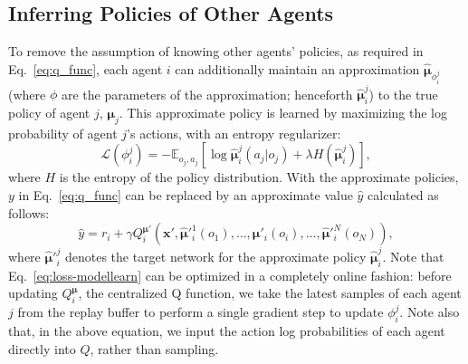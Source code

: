 \documentclass{article}
\newcommand{\comment}[1]{\textbf{\textcolor{red}{comment: #1}}}
\newcommand{\cpol}[0]{\pmb{\mu}}
\begin{document}
\subsection{Inferring Policies of Other Agents}
\label{sec:modellearning}
To remove the assumption of knowing other agents' policies, as required in Eq.~\ref{eq:q_func}, each agent $i$ can additionally maintain an approximation $\hat{\cpol}_{\phi_i^j}$ (where $\phi$ are the parameters of the approximation; henceforth $\hat{\cpol}_i^j$) to the true policy of agent $j$, $\cpol_j$. This approximate policy is learned by maximizing the log probability of agent $j$'s actions, with an entropy regularizer:
\begin{equation}\label{eq:loss-modellearn}
\mathcal{L}(\phi_i^j)=-\mathbb{E}_{o_j,a_j}\left[\log \hat{\cpol}_i^j(a_j|o_j) + \lambda H(\hat{\cpol}_i^j) \right],
\end{equation}
where $H$ is the entropy of the policy distribution. With the approximate policies, $y$ in Eq.~\ref{eq:q_func} can be replaced by an approximate value $\hat{y}$ calculated as follows: 
\begin{equation}\label{eq:approx_q_func}
\hat{y} = r_i + \gamma Q^{\cpol'}_i(\mathbf{x}', \hat{\cpol}'^1_i(o_1),\ldots,\cpol'_i(o_i),\ldots,\hat{\cpol}'^N_i(o_N)),
\end{equation}
where $\hat{\cpol}'^j_i$ denotes the target network for the approximate policy $\hat{\cpol}_i^j$.
Note that Eq.~\ref{eq:loss-modellearn} can be optimized in a completely online fashion: before updating  $Q^{\cpol}_i$, the centralized Q function, we take the latest samples of each agent $j$ from the replay buffer to perform a single gradient step to update $\phi_i^j$. %
Note also that, in the above equation, we input the action log probabilities of each agent directly into $Q$, rather than sampling.
\end{document}
